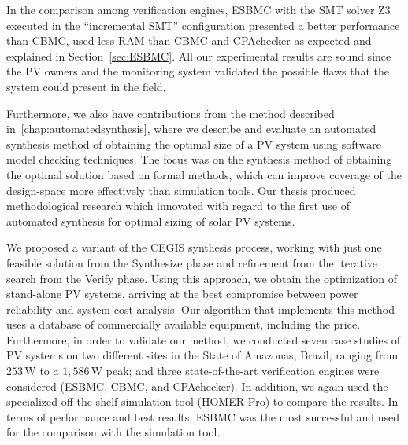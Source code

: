 %
In the comparison among verification engines, ESBMC with the SMT solver Z3 executed in the ``incremental SMT'' configuration presented a better performance than CBMC, used less RAM than CBMC and CPAchecker as expected and explained in Section~\ref{sec:ESBMC}. All our experimental results are sound since the PV owners and the monitoring system validated the possible flaws that the system could present in the field.

Furthermore, we also have contributions from the method described in~\autoref{chap:automatedsynthesis}, where we describe and evaluate an automated synthesis method of obtaining the optimal size of a PV system using software model checking techniques. The focus was on the synthesis method of obtaining the optimal solution based on formal methods, which can improve coverage of the design-space more effectively than simulation tools. Our thesis produced methodological research which innovated with regard to the first use of automated synthesis for optimal sizing of solar PV systems.

We proposed a variant of the CEGIS synthesis process, working with just one feasible solution from the {\sc Synthesize} phase and refinement from the iterative search from the {\sc Verify} phase. Using this approach, we obtain the optimization of stand-alone PV systems, arriving at the best compromise between power reliability and system cost analysis. Our algorithm that implements this method uses a database of commercially available equipment, including the price. Furthermore, in order to validate our method, we conducted seven case studies of PV systems on two different sites in the State of Amazonas, Brazil, ranging from $253$\,W to a $1,586$\,W peak; and three state-of-the-art verification engines were considered (ESBMC, CBMC, and CPAchecker). In addition, we again used the specialized off-the-shelf simulation tool (HOMER Pro) to compare the results. In terms of performance and best results, ESBMC was the most successful and used for the comparison with the simulation tool.

